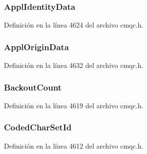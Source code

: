 \subsubsection[{Appl\+Identity\+Data}]{ Appl\+Identity\+Data}\label{structtag_m_q_m_d2_a1f16948c5ba6adfbb92776400030700e}


Definición en la línea 4624 del archivo cmqc.\+h.

\hypertarget{structtag_m_q_m_d2_aaf3c543f992b06c609193929872b998a}{}
\subsubsection[{Appl\+Origin\+Data}]{ Appl\+Origin\+Data}\label{structtag_m_q_m_d2_aaf3c543f992b06c609193929872b998a}


Definición en la línea 4632 del archivo cmqc.\+h.

\hypertarget{structtag_m_q_m_d2_afd269725e61f1620f8182ccd914d8dae}{}
\subsubsection[{Backout\+Count}]{ Backout\+Count}\label{structtag_m_q_m_d2_afd269725e61f1620f8182ccd914d8dae}


Definición en la línea 4619 del archivo cmqc.\+h.

\hypertarget{structtag_m_q_m_d2_a4d8d1961a991850d1355cdf9b4680b8e}{}
\subsubsection[{Coded\+Char\+Set\+Id}]{ Coded\+Char\+Set\+Id}\label{structtag_m_q_m_d2_a4d8d1961a991850d1355cdf9b4680b8e}


Definición en la línea 4612 del archivo cmqc.\+h.

\hypertarget{structtag_m_q_m_d2_acac8d73138c2c618b41a274eb92e5f2a}{}
